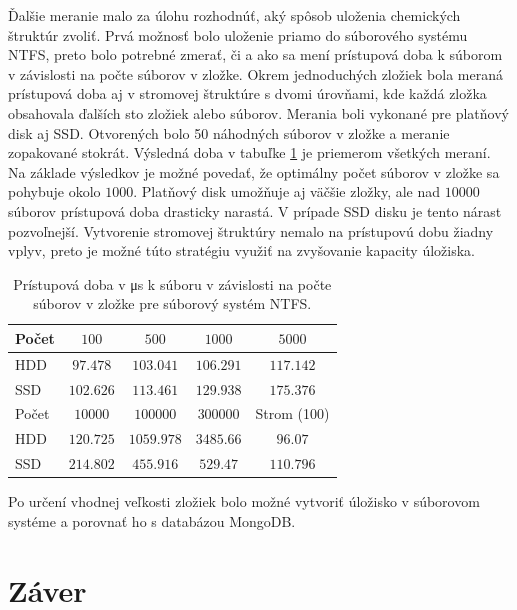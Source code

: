 \documentclass[slovak]{ExcelAtFIT} %
\begin{document}
Ďalšie meranie malo za úlohu rozhodnúť, aký spôsob uloženia chemických štruktúr zvoliť. Prvá možnosť bolo uloženie priamo do súborového systému NTFS, preto bolo potrebné zmerať, či a ako sa mení prístupová doba k súborom v závislosti na počte súborov v zložke. Okrem jednoduchých zložiek bola meraná prístupová doba aj v stromovej štruktúre s dvomi úrovňami, kde každá zložka obsahovala ďalších sto zložiek alebo súborov. Merania boli vykonané pre platňový disk aj SSD. Otvorených bolo 50 náhodných súborov v zložke a meranie zopakované stokrát. Výsledná doba v tabuľke \ref{tab:disk_access} je priemerom všetkých meraní. Na základe výsledkov je možné povedať, že optimálny počet súborov v zložke sa pohybuje okolo $1000$. Platňový disk umožňuje aj väčšie zložky, ale nad $10000$ súborov prístupová doba drasticky narastá. V prípade SSD disku je tento nárast pozvoľnejší. Vytvorenie stromovej štruktúry nemalo na prístupovú dobu žiadny vplyv, preto je možné túto stratégiu využiť na zvyšovanie kapacity úložiska. 

\begin{table}[h]
	\vskip6pt
	\caption{Prístupová doba v \si{\micro\second} k súboru v závislosti na počte súborov v zložke pre súborový systém NTFS.}
	\centering
	\begin{tabular}{l|c|c|c|c}
		\toprule
		Počet & $100$ & $500$ & $1000$ & $5000$ \\
		\midrule
		HDD & $97.478$ & $103.041$ & $106.291$ & $117.142$ \\
		SSD & $102.626$ & $113.461$ & $129.938$ & $175.376$ \\
		\midrule[2px]
		Počet & $10000$ & $100000$ & $300000$ & Strom (100)\\
		\midrule
		HDD & $120.725$ & $1059.978$ & $3485.66$ & $96.07$
		 \\
		SSD & $214.802$ & $455.916$ & $529.47$ & $110.796$ \\
		\bottomrule
	\end{tabular}
	\label{tab:disk_access}
\end{table}

Po určení vhodnej veľkosti zložiek bolo možné vytvoriť úložisko v súborovom systéme a porovnať ho s databázou MongoDB.  


\section{Záver}
\label{sec:Conclusions}
\end{document}
